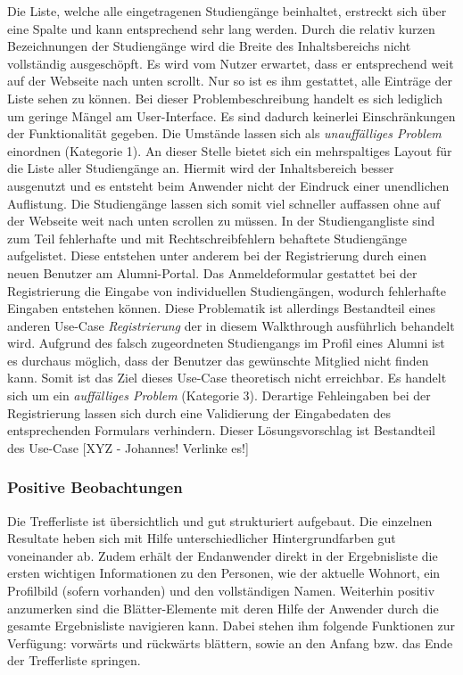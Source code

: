 {
	Die Liste, welche alle eingetragenen Studiengänge beinhaltet, erstreckt sich über eine Spalte und kann entsprechend sehr lang werden. Durch die relativ kurzen Bezeichnungen der Studiengänge wird die Breite des Inhaltsbereichs nicht vollständig ausgeschöpft. Es wird vom Nutzer erwartet, dass er entsprechend weit auf der Webseite nach unten scrollt. Nur so ist es ihm gestattet, alle Einträge der Liste sehen zu können.
}
{
	Bei dieser Problembeschreibung handelt es sich lediglich um geringe Mängel am User-Interface. Es sind dadurch keinerlei Einschränkungen der Funktionalität gegeben. Die Umstände lassen sich als \emph{unauffälliges Problem} einordnen (Kategorie 1).
}
{
	An dieser Stelle bietet sich ein mehrspaltiges Layout für die Liste aller Studiengänge an. Hiermit wird der Inhaltsbereich besser ausgenutzt und es entsteht beim Anwender nicht der Eindruck einer unendlichen Auflistung. Die Studiengänge lassen sich somit viel schneller auffassen ohne auf der Webseite weit nach unten scrollen zu müssen.
}
{
	In der Studiengangliste sind zum Teil fehlerhafte und mit Rechtschreibfehlern behaftete Studiengänge aufgelistet. Diese entstehen unter anderem bei der Registrierung durch einen neuen Benutzer am Alumni-Portal. Das Anmeldeformular gestattet bei der Registrierung die Eingabe von individuellen Studiengängen, wodurch fehlerhafte Eingaben entstehen können. Diese Problematik ist allerdings Bestandteil eines anderen Use-Case \emph{Registrierung} der in diesem Walkthrough ausführlich behandelt wird.
}
{
	Aufgrund des falsch zugeordneten Studiengangs im Profil eines Alumni ist es durchaus möglich, dass der Benutzer das gewünschte Mitglied nicht finden kann. Somit ist das Ziel dieses Use-Case theoretisch nicht erreichbar. Es handelt sich um ein \emph{auffälliges Problem} (Kategorie 3).
}
{
	Derartige Fehleingaben bei der Registrierung lassen sich durch eine Validierung der Eingabedaten des entsprechenden Formulars verhindern. Dieser Lösungsvorschlag ist Bestandteil des Use-Case [XYZ - Johannes! Verlinke es!]
}


\subsubsection*{Positive Beobachtungen}
Die Trefferliste ist übersichtlich und gut strukturiert aufgebaut. Die einzelnen Resultate heben sich mit Hilfe unterschiedlicher Hintergrundfarben gut voneinander ab. Zudem erhält der Endanwender direkt in der Ergebnisliste die ersten wichtigen Informationen zu den Personen, wie der aktuelle Wohnort, ein Profilbild (sofern vorhanden) und den vollständigen Namen. Weiterhin positiv anzumerken sind die Blätter-Elemente mit deren Hilfe der Anwender durch die gesamte Ergebnisliste navigieren kann. Dabei stehen ihm folgende Funktionen zur Verfügung: vorwärts und rückwärts blättern, sowie an den Anfang bzw. das Ende der Trefferliste springen. 

